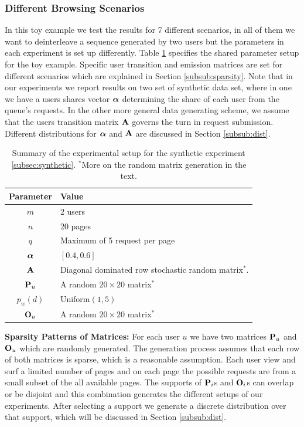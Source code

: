 	\subsubsection{Different Browsing Scenarios}
	In this toy example we test the results for 7 different scenarios, in all of them we want to deinterleave a sequence generated by two users but the parameters in each experiment is set up differently.
	Table \ref{tab:toy} specifies the shared parameter setup for the toy example.
	Specific user transition and emission matrices are set for different scenarios which are explained in Section \ref{subsub:sparsity}.
	Note that in our experiments we report results on two set of synthetic data set, where in one we have a users shares vector $\aalpha$ determining the share of each user from the queue's requests.
	In the other more general data generating scheme, we assume that the users transition matrix $\A$ governs the turn in request submission.
	Different distributions for $\aalpha$ and $\A$ are discussed in Section \ref{subsub:dist}.
	
	\begin{table}
		\centering
		\begin{tabular}{|c|l|}
			\hline
			Parameter & Value \\ 
			\hline  
			$m$ & 2 users \\ \hline
			$n$ & 20 pages \\ \hline
			$q$ & Maximum of 5 request per page\\ \hline 
			\hline 
			$\aalpha$ & $[0.4, 0.6]$ \\ \hline 
			$\A$ & Diagonal dominated row stochastic random matrix$^*$. \\ \hline 
			$\P_u$ & A random $20 \times 20$ matrix$^*$ \\ \hline 			
			$p_w(d)$ & $\text{Uniform}(1,5)$ \\ \hline 
			$\O_u$ & A random $20 \times 20$ matrix$^*$ \\ \hline 
		\end{tabular}
		\caption{Summary of the experimental setup for the synthetic experiment \ref{subsec:synthetic}. $^*$More on the random matrix generation in the text.}
		\label{tab:toy}
	\end{table}
	
	{\bf Sparsity Patterns of Matrices:}
	\label{subsub:sparsity}
	For each user $u$ we have two matrices $\P_u$ and $\O_u$ which are randomly generated. 
	The generation process assumes that each row of both matrices is sparse, which is a reasonable assumption. 
	Each user view and surf a limited number of pages and on each page the possible requests are from a small subset of the all available pages. 
	The supports of $\P_i$s and $\O_i$s can overlap or be disjoint and this combination generates the different setups of our experiments.  
	After selecting a support we generate a discrete distribution over that support, which will be discussed in Section \ref{subsub:dist}.
	
